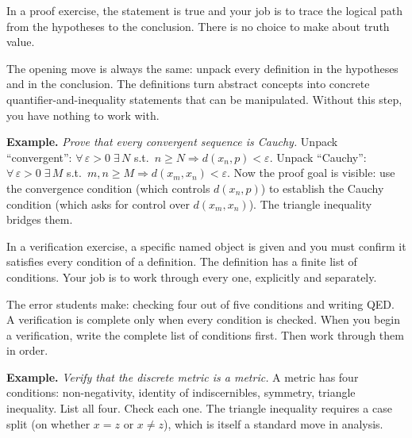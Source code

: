 \begin{remark}
In a proof exercise, the statement is true and your job is to trace
the logical path from the hypotheses to the conclusion. There is no
choice to make about truth value.

The opening move is always the same: unpack every definition in the
hypotheses and in the conclusion. The definitions turn abstract concepts
into concrete quantifier-and-inequality statements that can be
manipulated. Without this step, you have nothing to work with.

\textbf{Example.} \textit{Prove that every convergent sequence is Cauchy.}
Unpack ``convergent'': $\forall\,\varepsilon>0\;\exists\, N$ s.t.\
$n \geq N \Rightarrow d(x_n, p) < \varepsilon$.
Unpack ``Cauchy'': $\forall\,\varepsilon>0\;\exists\, M$ s.t.\
$m,n \geq M \Rightarrow d(x_m, x_n) < \varepsilon$.
Now the proof goal is visible: use the convergence condition (which
controls $d(x_n, p)$) to establish the Cauchy condition (which asks
for control over $d(x_m, x_n)$). The triangle inequality bridges them.
\end{remark}

\begin{remark}
In a verification exercise, a specific named object is given and you
must confirm it satisfies every condition of a definition. The definition
has a finite list of conditions. Your job is to work through every one,
explicitly and separately.

The error students make: checking four out of five conditions and
writing QED. A verification is complete only when every condition
is checked. When you begin a verification, write the complete list of
conditions first. Then work through them in order.

\textbf{Example.} \textit{Verify that the discrete metric is a metric.}
A metric has four conditions: non-negativity, identity of indiscernibles,
symmetry, triangle inequality. List all four. Check each one.
The triangle inequality requires a case split (on whether $x = z$ or
$x \neq z$), which is itself a standard move in analysis.
\end{remark}

